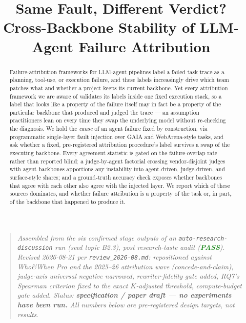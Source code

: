 \documentclass[11pt]{article}
\title{\textbf{Same Fault, Different Verdict?\\ Cross-Backbone Stability of LLM-Agent Failure Attribution}}
\author{}
\date{}
\begin{document}
\maketitle
\vspace{-2em}

\begin{quote}
\small\textit{Assembled from the six confirmed stage outputs of an \texttt{auto-research-discussion} run (seed topic B2.3), post research-taste audit (\textcolor{ForestGreen}{\textbf{PASS}}). Revised 2026-08-21 per \texttt{review\_2026-08.md}: repositioned against Who\&When Pro and the 2025--26 attribution wave (concede-and-claim), judge-axis universal negative narrowed, rewriter-fidelity gate added, RQ7's Spearman criterion fixed to the exact $K$-adjusted threshold, compute-budget gate added. Status: \textbf{specification / paper draft --- no experiments have been run.} All numbers below are pre-registered design targets, not results.}
\end{quote}

\begin{abstract}
Failure-attribution frameworks for LLM-agent pipelines label a failed task trace as a planning, tool-use, or execution failure, and these labels increasingly drive which team patches what and whether a project keeps its current backbone. Yet every attribution framework we are aware of validates its labels inside one fixed execution stack, so a label that looks like a property of the failure itself may in fact be a property of the particular backbone that produced and judged the trace --- an assumption practitioners lean on every time they swap the underlying model without re-checking the diagnosis. We hold the \emph{cause} of an agent failure fixed by construction, via programmatic single-layer fault injection over GAIA and WebArena-style tasks, and ask whether a fixed, pre-registered attribution procedure's label survives a swap of the executing backbone. Every agreement statistic is gated on the failure-overlap rate rather than reported blind; a judge-by-agent factorial crossing vendor-disjoint judges with agent backbones apportions any instability into agent-driven, judge-driven, and surface-style shares; and a ground-truth accuracy check exposes whether backbones that agree with each other also agree with the injected layer. We report which of these sources dominates, and whether failure attribution is a property of the task or, in part, of the backbone that happened to produce it.
\end{abstract}
\end{document}
